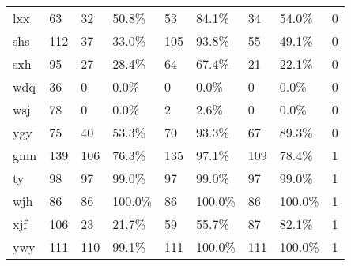 \begin{landscape}
\begin{longtable}{m{2cm}<{\centering}m{2cm}<{\centering}m{2cm}<{\centering}m{2cm}<{\centering}m{2cm}<{\centering}m{2cm}<{\centering}m{2cm}<{\centering}m{2cm}<{\centering}m{2cm}<{\centering}}
            lxx                   & 63                    & 32         & 50.8\%     & 53         & 84.1\%     & 34         & 54.0\%      & 0                                                                      \\
            shs                   & 112                   & 37         & 33.0\%     & 105        & 93.8\%     & 55         & 49.1\%      & 0                                                                      \\
            sxh                   & 95                    & 27         & 28.4\%     & 64         & 67.4\%     & 21         & 22.1\%      & 0                                                                      \\
            wdq                   & 36                    & 0          & 0.0\%      & 0          & 0.0\%      & 0          & 0.0\%       & 0                                                                      \\
            wsj                   & 78                    & 0          & 0.0\%      & 2          & 2.6\%      & 0          & 0.0\%       & 0                                                                      \\
            ygy                   & 75                    & 40         & 53.3\%     & 70         & 93.3\%     & 67         & 89.3\%      & 0                                                                      \\
            gmn                   & 139                   & 106        & 76.3\%     & 135        & 97.1\%     & 109        & 78.4\%      & 1                                                                      \\
            ty                    & 98                    & 97         & 99.0\%     & 97         & 99.0\%     & 97         & 99.0\%      & 1                                                                      \\
            wjh                   & 86                    & 86         & 100.0\%    & 86         & 100.0\%    & 86         & 100.0\%     & 1                                                                      \\
            xjf                   & 106                   & 23         & 21.7\%     & 59         & 55.7\%     & 87         & 82.1\%      & 1                                                                      \\
            ywy                   & 111                   & 110        & 99.1\%     & 111        & 100.0\%    & 111        & 100.0\%     & 1                                                                      \\

\end{longtable}
\end{landscape}
